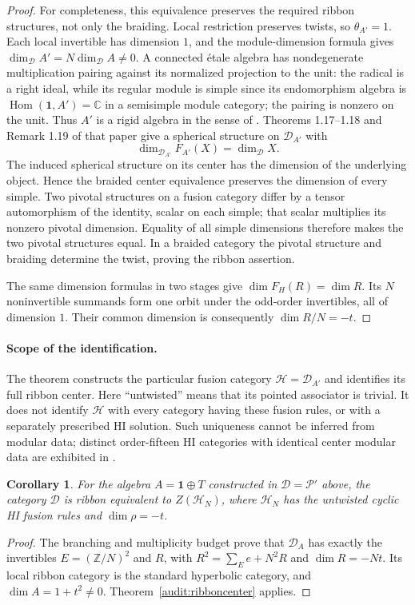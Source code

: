 \documentclass[11pt,a4paper]{article}
\numberwithin{equation}{section}
\newtheorem{corollary}[theorem]{Corollary}
\theoremstyle{definition}\newtheorem{definition}[theorem]{Definition}
\theoremstyle{remark}\newtheorem{remark}[theorem]{Remark}
\newcommand{\Par}{\mathcal P}\newcommand{\Neu}{\mathcal D}
\begin{document}
\begin{proof}
For completeness, this equivalence preserves the required ribbon
structures, not only the braiding.
Local restriction preserves twists, so $\theta_{A'}=1$.
Each local invertible has dimension $1$, and the module-dimension
formula gives $\dim_{\mathcal D}A'=N\dim_{\mathcal D}A\ne0$.
A connected \'etale algebra has nondegenerate multiplication pairing
against its normalized projection to the unit: the radical is a
right ideal, while its regular module is simple since its endomorphism
algebra is $\operatorname{Hom}(\mathbf1,A')=\mathbb C$ in a semisimple
module category; the pairing is nonzero on the unit. Thus $A'$ is a
rigid algebra in the sense of \cite[Definition 1.11]{ko}.
Theorems 1.17--1.18 and Remark 1.19 of that paper give a spherical
structure on $\mathcal D_{A'}$ with
\[
 \dim_{\mathcal D_{A'}}F_{A'}(X)=\dim_{\mathcal D}X.
\]
The induced spherical structure on its center has the dimension of
the underlying object. Hence the braided center equivalence preserves
the dimension of every simple. Two pivotal structures on a fusion
category differ by a tensor automorphism of the identity, scalar on
each simple; that scalar multiplies its nonzero pivotal dimension.
Equality of all simple dimensions therefore makes the two pivotal
structures equal. In a braided category the pivotal structure and
braiding determine the twist, proving the ribbon assertion.

The same dimension formulas in two stages give
$\dim F_H(R)=\dim R$. Its $N$ noninvertible summands form one orbit
under the odd-order invertibles, all of dimension $1$. Their common
dimension is consequently $\dim R/N=-t$.
\end{proof}

\paragraph{Scope of the identification.}
The theorem constructs the particular fusion category
$\mathcal H=\mathcal D_{A'}$ and identifies its full ribbon center.
Here ``untwisted'' means that its pointed associator is trivial.
It does not identify $\mathcal H$ with every category having these
fusion rules, or with a separately prescribed HI solution.
Such uniqueness cannot be inferred from modular data; distinct
order-fifteen HI categories with identical center modular data are
exhibited in \cite[Corollary 5.9]{gsy}.

\begin{corollary}\label{cor:our-center}
For the algebra $A=\mathbf1\oplus T$ constructed in $\mathcal D=\Par'$
above, the category $\mathcal D$ is ribbon equivalent to
$Z(\mathcal H_N)$, where $\mathcal H_N$ has the untwisted cyclic HI
fusion rules and $\dim\rho=-t$.
\end{corollary}
\begin{proof}
The branching and multiplicity budget prove that
$\mathcal D_A$ has exactly the invertibles $E=(\mathbb Z/N)^2$ and
$R$, with $R^2=\sum_E e+N^2R$ and $\dim R=-Nt$.
Its local ribbon category is the standard hyperbolic category,
and $\dim A=1+t^2\ne0$. Theorem~\ref{audit:ribboncenter} applies.
\end{proof}
\end{document}
